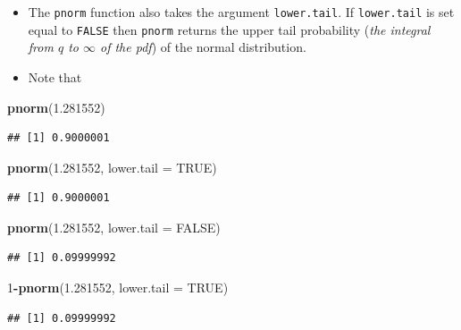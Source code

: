 \documentclass[
]{book}
\newenvironment{Shaded}{\begin{snugshade}}{\end{snugshade}}
\newcommand{\AttributeTok}[1]{\textcolor[rgb]{0.13,0.29,0.53}{#1}}
\newcommand{\ConstantTok}[1]{\textcolor[rgb]{0.56,0.35,0.01}{#1}}
\newcommand{\DecValTok}[1]{\textcolor[rgb]{0.00,0.00,0.81}{#1}}
\newcommand{\FloatTok}[1]{\textcolor[rgb]{0.00,0.00,0.81}{#1}}
\newcommand{\FunctionTok}[1]{\textcolor[rgb]{0.13,0.29,0.53}{\textbf{#1}}}
\newcommand{\NormalTok}[1]{#1}
\newcommand{\SpecialCharTok}[1]{\textcolor[rgb]{0.81,0.36,0.00}{\textbf{#1}}}
\begin{document}
\begin{itemize}
\item
  The \texttt{pnorm} function also takes the argument \texttt{lower.tail}. If \texttt{lower.tail} is set equal to \texttt{FALSE} then \texttt{pnorm} returns the upper tail probability (\emph{the integral from \(q\) to \(\infty\) of the pdf}) of the normal distribution.
\item
  Note that
\end{itemize}

\begin{Shaded}
\begin{Highlighting}[]
\FunctionTok{pnorm}\NormalTok{(}\FloatTok{1.281552}\NormalTok{)}
\end{Highlighting}
\end{Shaded}

\begin{verbatim}
## [1] 0.9000001
\end{verbatim}

\begin{Shaded}
\begin{Highlighting}[]
\FunctionTok{pnorm}\NormalTok{(}\FloatTok{1.281552}\NormalTok{, }\AttributeTok{lower.tail =} \ConstantTok{TRUE}\NormalTok{)}
\end{Highlighting}
\end{Shaded}

\begin{verbatim}
## [1] 0.9000001
\end{verbatim}

\begin{Shaded}
\begin{Highlighting}[]
\FunctionTok{pnorm}\NormalTok{(}\FloatTok{1.281552}\NormalTok{, }\AttributeTok{lower.tail =} \ConstantTok{FALSE}\NormalTok{) }
\end{Highlighting}
\end{Shaded}

\begin{verbatim}
## [1] 0.09999992
\end{verbatim}

\begin{Shaded}
\begin{Highlighting}[]
\DecValTok{1}\SpecialCharTok{{-}}\FunctionTok{pnorm}\NormalTok{(}\FloatTok{1.281552}\NormalTok{, }\AttributeTok{lower.tail =} \ConstantTok{TRUE}\NormalTok{)}
\end{Highlighting}
\end{Shaded}

\begin{verbatim}
## [1] 0.09999992
\end{verbatim}
\end{document}
